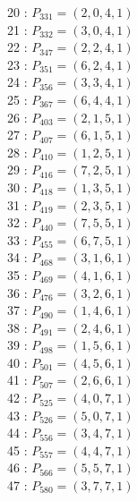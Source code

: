 \documentclass{article}
\begin{document}
{\begin{multicols}{2}
20 : $P_{331}=( 2, 0, 4, 1 )$\\
21 : $P_{332}=( 3, 0, 4, 1 )$\\
22 : $P_{347}=( 2, 2, 4, 1 )$\\
23 : $P_{351}=( 6, 2, 4, 1 )$\\
24 : $P_{356}=( 3, 3, 4, 1 )$\\
25 : $P_{367}=( 6, 4, 4, 1 )$\\
26 : $P_{403}=( 2, 1, 5, 1 )$\\
27 : $P_{407}=( 6, 1, 5, 1 )$\\
28 : $P_{410}=( 1, 2, 5, 1 )$\\
29 : $P_{416}=( 7, 2, 5, 1 )$\\
30 : $P_{418}=( 1, 3, 5, 1 )$\\
31 : $P_{419}=( 2, 3, 5, 1 )$\\
32 : $P_{440}=( 7, 5, 5, 1 )$\\
33 : $P_{455}=( 6, 7, 5, 1 )$\\
34 : $P_{468}=( 3, 1, 6, 1 )$\\
35 : $P_{469}=( 4, 1, 6, 1 )$\\
36 : $P_{476}=( 3, 2, 6, 1 )$\\
37 : $P_{490}=( 1, 4, 6, 1 )$\\
38 : $P_{491}=( 2, 4, 6, 1 )$\\
39 : $P_{498}=( 1, 5, 6, 1 )$\\
40 : $P_{501}=( 4, 5, 6, 1 )$\\
41 : $P_{507}=( 2, 6, 6, 1 )$\\
42 : $P_{525}=( 4, 0, 7, 1 )$\\
43 : $P_{526}=( 5, 0, 7, 1 )$\\
44 : $P_{556}=( 3, 4, 7, 1 )$\\
45 : $P_{557}=( 4, 4, 7, 1 )$\\
46 : $P_{566}=( 5, 5, 7, 1 )$\\
47 : $P_{580}=( 3, 7, 7, 1 )$\\
\end{multicols}
}
\end{document}
